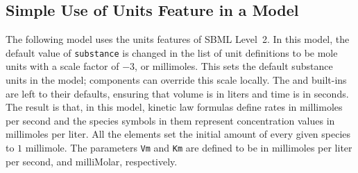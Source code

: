 \documentclass[10pt]{cekarticle}
\begin{document}
\subsection{Simple Use of Units Feature in a Model}
\label{apdx:units-eg}

The following model uses the units features of SBML Level~2.  In
this model, the default value of \texttt{substance} is changed in
the list of unit definitions to be mole units with a scale factor
of $-3$, or millimoles.  This sets the default substance units in
the model; components can override this scale locally.  The
 and  built-ins are left to their
defaults, ensuring that volume is in liters and time is in
seconds.  The result is that, in this model, kinetic law formulas
define rates in millimoles per second and the species symbols in
them represent concentration values in millimoles per liter.  All
the  elements set the initial amount of every given
species to $1$ millimole.  The parameters \texttt{Vm} and
\texttt{Km} are defined to be in millimoles per liter per second,
and milliMolar, respectively.
\end{document}
